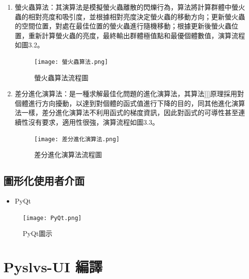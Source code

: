 \documentclass[14pt,a4paper]{report}  %
\newcommand{\fourteen}{\fontsize{14pt}{\baselineskip}\selectfont}%
\begin{document}
{\begin{enumerate}
       \item {螢火蟲算法：其演算法是模擬螢火蟲離散的閃爍行為，算法將計算群體中螢火蟲的相對亮度和吸引度，並根據相對亮度決定螢火蟲的移動方向；更新螢火蟲的空間位置，對處在最佳位置的螢火蟲進行隨機移動；根據更新後螢火蟲位置，重新計算螢火蟲的亮度，最終輸出群體極值點和最優個體數值，演算流程如圖3.2。}
       
		\begin{figure}[hbt!]
        \centering
        \texttt{[image: 螢火蟲算法.png]} 
        \caption{螢火蟲算法流程圖}
        \label{fig:scale}
        \end{figure}
    \newpage   
       \item {差分進化演算法：是一種求解最佳化問題的進化演算法，其算法]]]原理採用對個體進行方向擾動，以達到對個體的函式值進行下降的目的，同其他進化演算法一樣，差分進化演算法不利用函式的梯度資訊，因此對函式的可導性甚至連續性沒有要求，適用性很強，演算流程如圖3.3。} 
                       
        \begin{figure}[hbt!]
        \centering
        \texttt{[image: 差分進化演算法.png]} 
        \caption{差分進化演算法流程圖}
        \label{fig:scale}
		\end{figure}
		
	\end{enumerate}
    \newpage
      \subsection{圖形化使用者介面}
      \begin{itemize}
      \item{PyQt}
      \end{itemize}
      \fourteen {Qt被廣泛應用於開發圖形化介面程式。主要特色為使用相同的程式碼皆可在支援的平台上執行與編譯，PyQt是Python語言的GUI編程解決方案之一，與Qt一樣是一個自由軟體，其API也與Qt類似，因此Qt的文件仍然可以應用於此，且與相同性質的軟體比較，PyQt的編程庫文件豐富許多。} 
      \begin{figure}[hbt!]
        \centering
        \texttt{[image: PyQt.png]} 
        \caption{PyQt圖示}
        \label{fig:scale}
        \end{figure}
      \section{Pyslvs-UI 編譯}


}
\end{document}
